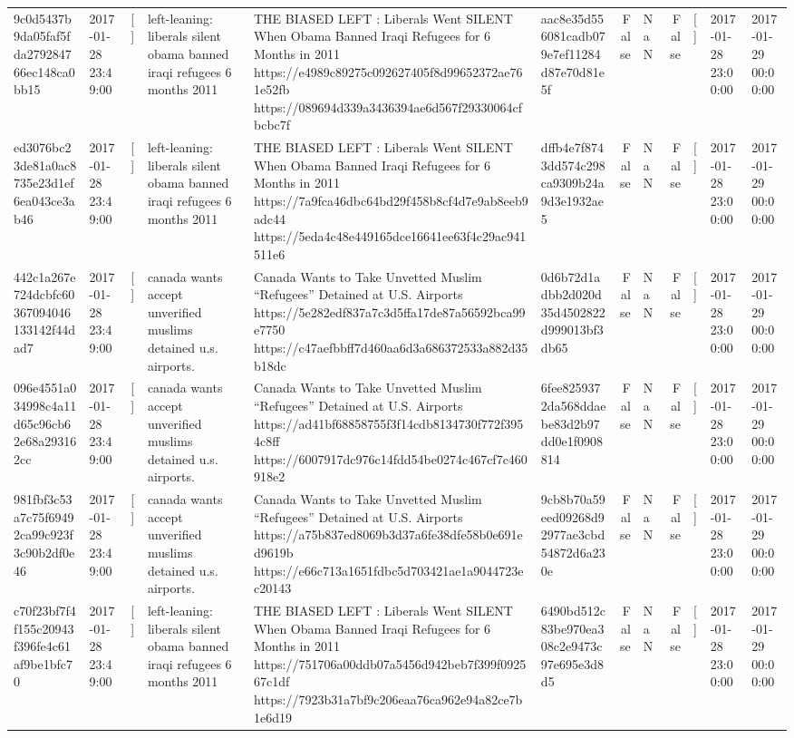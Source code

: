 \begin{tabular}{llllllrlrlll}
9c0d5437b9da05faf5fda279284766ec148ca0bb15 & 2017-01-28 23:49:00 & [] & left-leaning: liberals silent obama banned iraqi refugees 6 months 2011 & THE BIASED LEFT : Liberals Went SILENT When Obama Banned Iraqi Refugees for 6 Months in 2011 https://e4989c89275c092627405f8d99652372ae761e52fb https://089694d339a3436394ae6d567f29330064cfbcbc7f & aac8e35d556081cadb079e7ef11284d87e70d81e5f & False & NaN & False & [] & 2017-01-28 23:00:00 & 2017-01-29 00:00:00 \\
ed3076bc23de81a0ac8735e23d1ef6ea043ce3ab46 & 2017-01-28 23:49:00 & [] & left-leaning: liberals silent obama banned iraqi refugees 6 months 2011 & THE BIASED LEFT : Liberals Went SILENT When Obama Banned Iraqi Refugees for 6 Months in 2011 https://7a9fca46dbc64bd29f458b8cf4d7e9ab8eeb9adc44 https://5eda4c48e449165dce16641ee63f4c29ac941511e6 & dffb4e7f8743dd574c298ca9309b24a9d3e1932ae5 & False & NaN & False & [] & 2017-01-28 23:00:00 & 2017-01-29 00:00:00 \\
442c1a267e724dcbfc60367094046133142f44dad7 & 2017-01-28 23:49:00 & [] & canada wants accept unverified muslims detained u.s. airports. & Canada Wants to Take Unvetted Muslim “Refugees” Detained at U.S. Airports https://5e282edf837a7c3d5ffa17de87a56592bca99e7750 https://c47aefbbff7d460aa6d3a686372533a882d35b18dc & 0d6b72d1adbb2d020d35d4502822d999013bf3db65 & False & NaN & False & [] & 2017-01-28 23:00:00 & 2017-01-29 00:00:00 \\
096e4551a034998c4a11d65c96cb62e68a293162cc & 2017-01-28 23:49:00 & [] & canada wants accept unverified muslims detained u.s. airports. & Canada Wants to Take Unvetted Muslim “Refugees” Detained at U.S. Airports https://ad41bf68858755f3f14cdb8134730f772f3954c8ff https://6007917dc976c14fdd54be0274c467cf7c460918e2 & 6fee8259372da568ddaebe83d2b97dd0e1f0908814 & False & NaN & False & [] & 2017-01-28 23:00:00 & 2017-01-29 00:00:00 \\
981fbf3c53a7c75f69492ca99c923f3c90b2df0e46 & 2017-01-28 23:49:00 & [] & canada wants accept unverified muslims detained u.s. airports. & Canada Wants to Take Unvetted Muslim “Refugees” Detained at U.S. Airports https://a75b837ed8069b3d37a6fe38dfe58b0e691ed9619b https://e66c713a1651fdbc5d703421ae1a9044723ec20143 & 9cb8b70a59eed09268d92977ae3cbd54872d6a230e & False & NaN & False & [] & 2017-01-28 23:00:00 & 2017-01-29 00:00:00 \\
c70f23bf7f4f155c20943f396fe4c61af9be1bfc70 & 2017-01-28 23:49:00 & [] & left-leaning: liberals silent obama banned iraqi refugees 6 months 2011 & THE BIASED LEFT : Liberals Went SILENT When Obama Banned Iraqi Refugees for 6 Months in 2011 https://751706a00ddb07a5456d942beb7f399f092567c1df https://7923b31a7bf9c206eaa76ca962e94a82ce7b1e6d19 & 6490bd512c83be970ea308c2e9473c97e695e3d8d5 & False & NaN & False & [] & 2017-01-28 23:00:00 & 2017-01-29 00:00:00 \\

\end{tabular}
